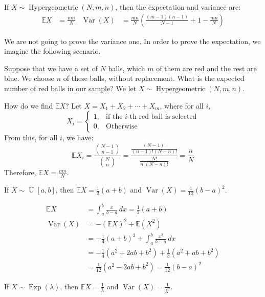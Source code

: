 \documentclass{huhtakm-template-book}
\newcommand{\expect}{\mathbb{E}}
\DeclareMathOperator{\Hypergeometric}{Hypergeometric}
\DeclareMathOperator{\U}{U}
\DeclareMathOperator{\Exp}{Exp}
\DeclareMathOperator{\Var}{Var}
\begin{document}
\begin{thm}
	If $X\sim\Hypergeometric(N,m,n)$, then the expectation and variance are:
	\begin{align*}
		\expect{X}&=\frac{mn}{N} & \Var(X)&=\frac{mn}{N}\left(\frac{(m-1)(n-1)}{N-1}+1-\frac{mn}{N}\right)
	\end{align*}
\end{thm}

\newpage
We are not going to prove the variance one. In order to prove the expectation, we imagine the following scenario.
\begin{eg}
	Suppose that we have a set of $N$ balls, which $m$ of them are red and the rest are blue. We choose $n$ of these balls, without replacement. What is the expected number of red balls in our sample? We let $X\sim\Hypergeometric(N,m,n)$.
	
	How do we find $\expect{X}$? Let $X=X_{1}+X_{2}+\cdots+X_{m}$, where for all $i$,
	\begin{equation*}
		X_{i}=\begin{cases}
			1, &\text{if the $i$-th red ball is selected}\\
			0, &\text{Otherwise}
		\end{cases}
	\end{equation*}
	From this, for all $i$, we have:
	\begin{equation*}
		\expect{X_{i}}=\frac{\binom{N-1}{n-1}}{\binom{N}{n}}=\frac{\frac{(N-1)!}{(n-1)!(N-n)!}}{\frac{N!}{n!(N-n)!}}=\frac{n}{N}
	\end{equation*}
	Therefore, $\expect{X}=\frac{mn}{N}$.
\end{eg}
\begin{thm}
	If $X\sim\U[a,b]$, then $\expect{X}=\frac{1}{2}(a+b)$ and $\Var(X)=\frac{1}{12}(b-a)^{2}$.
\end{thm}
\begin{proofing}
	\begin{align*}
		\expect{X}&=\int_{a}^{b}\frac{x}{b-a}\,dx=\frac{1}{2}(a+b)\\
		\Var(X)&=-(\expect{X})^{2}+\expect(X^{2})\\
		&=-\frac{1}{4}(a+b)^{2}+\int_{a}^{b}\frac{x^{2}}{b-a}\,dx\\
		&=-\frac{1}{4}(a^{2}+2ab+b^{2})+\frac{1}{3}(a^{2}+ab+b^{2})\\
		&=\frac{1}{12}(a^{2}-2ab+b^{2})=\frac{1}{12}(b-a)^{2}
	\end{align*}
\end{proofing}
\begin{thm}
	If $X\sim\Exp(\lambda)$, then $\expect{X}=\frac{1}{\lambda}$ and $\Var(X)=\frac{1}{\lambda^{2}}$.
\end{thm}
\end{document}
